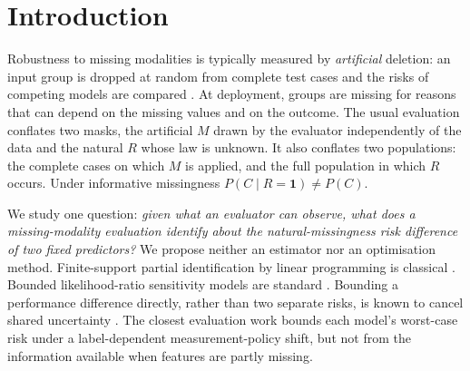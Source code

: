 \documentclass{article}
\theoremstyle{plain}
\theoremstyle{definition}
\theoremstyle{remark}
\newcommand{\one}{\mathbf{1}}
\begin{document}
\section{Introduction}
\label{sec:intro}

Robustness to missing modalities is typically measured by \emph{artificial}
deletion: an input group is dropped at random from complete test cases and
the risks of competing models are compared
\cite{neverova2016moddrop,ma2022multimodal}. At deployment, groups are
missing for reasons that can depend on the missing values and on the outcome.
The usual evaluation conflates two masks, the artificial $M$ drawn by the
evaluator independently of the data and the natural $R$ whose law is
unknown. It also conflates two populations: the complete cases on which $M$ is
applied, and the full population in which $R$ occurs. Under informative
missingness $P(C\mid R=\one)\neq P(C)$.

We study one question: \emph{given what an evaluator can observe, what does a
missing-modality evaluation identify about the natural-missingness risk
difference of two fixed predictors?} We propose neither an estimator nor an
optimisation method. Finite-support partial identification by linear
programming is classical \cite{manski2003partial,balke1997bounds,horowitz2000nonparametric}.
Bounded likelihood-ratio sensitivity models are standard
\cite{rosenbaum1987sensitivity,tan2006distributional,zhao2019sensitivity,dorn2023sharp}.
Bounding a performance difference directly, rather than two separate risks,
is known to cancel shared uncertainty \cite{guerdan2024predictive}. The closest
evaluation work \cite{subbaswamy2021evaluating} bounds each model's
worst-case risk under a label-dependent measurement-policy shift, but not
from the information available when features are partly missing.
\end{document}
